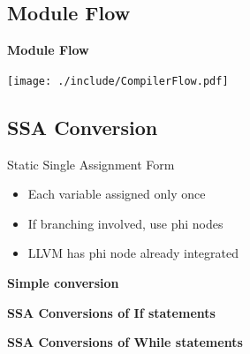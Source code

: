 \documentclass{beamer}
\begin{document}
\subsection{Module Flow}

\begin{frame}{\bf Module Flow}
  \begin{center}
    \texttt{[image: ./include/CompilerFlow.pdf]}
  \end{center}
\end{frame}


\subsection{SSA Conversion}

\begin{frame}{Static Single Assignment Form}
  \begin{itemize}
  \item<1->Each variable assigned only once
  \item<2->If branching involved, use phi nodes
  \item<3->LLVM has phi node already integrated
  \end{itemize}
\end{frame}

\begin{frame}{\bf Simple conversion}
  
\pause
  
\end{frame}

\begin{frame}[shrink]{\bf SSA Conversions of If statements}
  
\pause
  
\end{frame}

\begin{frame}[shrink]{\bf SSA Conversions of While statements}
  
\pause
  
\end{frame}
\end{document}
